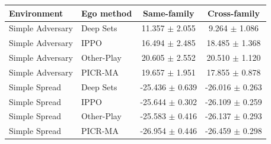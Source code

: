 \begin{tabular}{llcc}
\toprule
Environment & Ego method & Same-family & Cross-family \\
\midrule
Simple Adversary & Deep Sets & 11.357 $\pm$ 2.055 & 9.264 $\pm$ 1.086 \\
Simple Adversary & IPPO & 16.494 $\pm$ 2.485 & 18.485 $\pm$ 1.368 \\
Simple Adversary & Other-Play & 20.605 $\pm$ 2.552 & 20.510 $\pm$ 1.120 \\
Simple Adversary & PICR-MA & 19.657 $\pm$ 1.951 & 17.855 $\pm$ 0.878 \\
Simple Spread & Deep Sets & -25.436 $\pm$ 0.639 & -26.016 $\pm$ 0.263 \\
Simple Spread & IPPO & -25.644 $\pm$ 0.302 & -26.109 $\pm$ 0.259 \\
Simple Spread & Other-Play & -25.583 $\pm$ 0.416 & -26.137 $\pm$ 0.293 \\
Simple Spread & PICR-MA & -26.954 $\pm$ 0.446 & -26.459 $\pm$ 0.298 \\
\bottomrule
\end{tabular}
